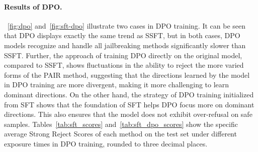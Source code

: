 \paragraph{Results of DPO.}
~\autoref{fig:dpo} and~\autoref{fig:sft-dpo} illustrate two cases in DPO training. It can be seen that DPO displays exactly the same trend as SSFT, but in both cases, DPO models recognize and handle all jailbreaking methods significantly slower than SSFT. 
Further, the approach of training DPO directly on the original model, compared to SSFT, shows fluctuations in the ability to reject the more varied forms of the PAIR method, suggesting that the directions learned by the model in DPO training are more divergent, making it more challenging to learn dominant directions.
On the other hand, the strategy of DPO training initialized from SFT shows that the foundation of SFT helps DPO focus more on dominant directions. This also ensures that the model does not exhibit over-refusal on safe samples.
Tables~\ref{tab:sft_scores} and~\ref{tab:sft_dpo_scores} show the specific average Strong Reject Scores of each method on the test set under different exposure times in DPO training, rounded to three decimal places.


